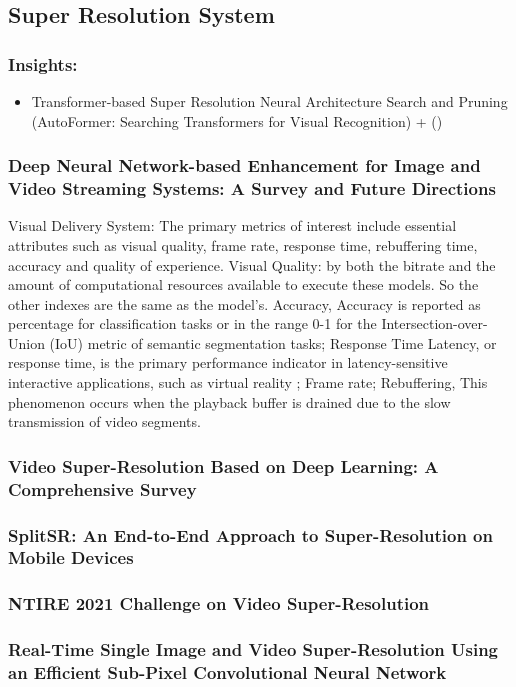 \documentclass[UTF8]{article}
\begin{document}
\subsection{Super Resolution System}
\subsubsection{Insights:}
\begin{itemize}
    \item Transformer-based Super Resolution Neural Architecture Search and Pruning (AutoFormer: Searching Transformers for Visual Recognition) + ()
\end{itemize}
\subsubsection{Deep Neural Network-based Enhancement for Image and Video Streaming Systems: A Survey and Future Directions}
Visual Delivery System: The primary metrics of interest include essential attributes such as visual quality, frame rate, response time, rebuffering time, accuracy and quality of experience. Visual Quality: by both the bitrate and the amount of computational resources available to execute these models. So the other indexes are the same as the model's. Accuracy, Accuracy is reported as percentage for classification tasks or in the range 0-1 for the Intersection-over-Union (IoU) metric of semantic segmentation tasks;  Response Time Latency, or response time, is the primary performance indicator in latency-sensitive interactive applications, such as virtual reality ; Frame rate; Rebuffering, This phenomenon occurs when the playback buffer is drained due to the slow transmission of video segments. 
\subsubsection{Video Super-Resolution Based on Deep Learning: A Comprehensive Survey}
\subsubsection{SplitSR: An End-to-End Approach to Super-Resolution on Mobile Devices}
\subsubsection{NTIRE 2021 Challenge on Video Super-Resolution}
\subsubsection{Real-Time Single Image and Video Super-Resolution Using an Efficient Sub-Pixel Convolutional Neural Network}
\end{document}

